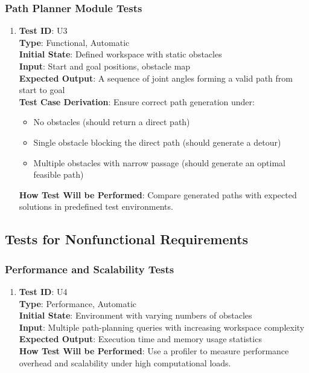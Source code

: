 \documentclass[12pt, titlepage]{article}
\begin{document}
\subsubsection{Path Planner Module Tests}

\begin{enumerate}
\item \textbf{Test ID}: U3 \\ 
\textbf{Type}: Functional, Automatic \\ 
\textbf{Initial State}: Defined workspace with static obstacles \\ 
\textbf{Input}: Start and goal positions, obstacle map \\ 
\textbf{Expected Output}: A sequence of joint angles forming a valid path from start to goal \\ 
\textbf{Test Case Derivation}: Ensure correct path generation under:
\begin{itemize}
    \item No obstacles (should return a direct path)
    \item Single obstacle blocking the direct path (should generate a detour)
    \item Multiple obstacles with narrow passage (should generate an optimal feasible path)
\end{itemize}
\textbf{How Test Will be Performed}: Compare generated paths with expected solutions in predefined test environments.
\end{enumerate}

\subsection{Tests for Nonfunctional Requirements}

\subsubsection{Performance and Scalability Tests}

\begin{enumerate}
\item \textbf{Test ID}: U4 \\ 
\textbf{Type}: Performance, Automatic \\ 
\textbf{Initial State}: Environment with varying numbers of obstacles \\ 
\textbf{Input}: Multiple path-planning queries with increasing workspace complexity \\ 
\textbf{Expected Output}: Execution time and memory usage statistics \\ 
\textbf{How Test Will be Performed}: Use a profiler to measure performance overhead and scalability under high computational loads.
\end{enumerate}
\end{document}
